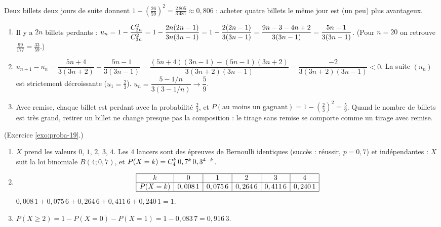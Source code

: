 \begin{corrige}
\begin{sol}
\begin{description}
\begin{enumerate}
            Deux billets deux jours de suite donnent $1 - \left(\frac{26}{59}\right)^2 = \frac{2\,805}{3\,481}\approx 0,806$ :
            acheter quatre billets le m\^eme jour est (un peu) plus avantageux.
      \end{enumerate}
\item[B.] \begin{enumerate}
      \item Il y a $2n$ billets perdants :
            $u_n = 1 - \dfrac{C_{2n}^{2}}{C_{3n}^{2}} = 1 - \dfrac{2n(2n-1)}{3n(3n-1)} = 1 - \dfrac{2(2n-1)}{3(3n-1)} = \dfrac{9n - 3 - 4n + 2}{3(3n-1)} = \dfrac{5n-1}{3(3n-1)}$.
            (Pour $n = 20$ on retrouve $\frac{99}{177} = \frac{33}{59}$.)
      \item $u_{n+1} - u_n = \dfrac{5n+4}{3(3n+2)} - \dfrac{5n-1}{3(3n-1)} = \dfrac{(5n+4)(3n-1) - (5n-1)(3n+2)}{3(3n+2)(3n-1)} = \dfrac{-2}{3(3n+2)(3n-1)} < 0$.
            La suite $(u_n)$ est strictement d\'ecroissante ($u_1 = \frac{2}{3}$).
            $u_n = \dfrac{5 - 1/n}{3(3 - 1/n)} \to \dfrac{5}{9}$.
      \item Avec remise, chaque billet est perdant avec la probabilit\'e $\frac{2}{3}$, et
            $P(\text{au moins un gagnant}) = 1 - \left(\frac{2}{3}\right)^2 = \frac{5}{9}$.
            Quand le nombre de billets est tr\`es grand, retirer un billet ne change presque pas la composition :
            le tirage sans remise se comporte comme un tirage avec remise.
      \end{enumerate}
\end{description}
\end{sol}
%
\begin{sol} (Exercice \ref{exo:proba-19}.)
\begin{enumerate}
\item $X$ prend les valeurs $0$, $1$, $2$, $3$, $4$. Les $4$ lancers sont des \'epreuves de Bernoulli identiques (succ\`es : r\'eussir, $p = 0,7$) et ind\'ependantes :
      $X$ suit la loi binomiale $B(4 ; 0,7)$, et $P(X=k) = C_{4}^{k}\,0,7^k\,0,3^{4-k}$.
\item \[
      \begin{array}{|c|c|c|c|c|c|}
      \hline
      k & 0 & 1 & 2 & 3 & 4 \\ \hline
      P(X=k) & 0,008\,1 & 0,075\,6 & 0,264\,6 & 0,411\,6 & 0,240\,1 \\ \hline
      \end{array}
      \]
      $0,008\,1 + 0,075\,6 + 0,264\,6 + 0,411\,6 + 0,240\,1 = 1$.
\item $P(X\geq 2) = 1 - P(X=0) - P(X=1) = 1 - 0,083\,7 = 0,916\,3$.

\end{enumerate}
\end{sol}
\end{corrige}
